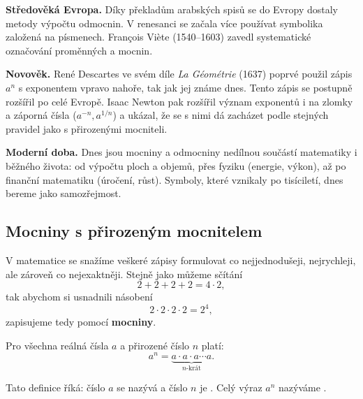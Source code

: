 \documentclass[12pt,a4paper]{article}
\begin{document}
\begin{historicalbox}
\smallskip
\textbf{Středověká Evropa.}  
Díky překladům arabských spisů se do Evropy dostaly metody výpočtu odmocnin. V renesanci se začala více používat symbolika založená na písmenech. François Viète (1540–1603) zavedl systematické označování proměnných a mocnin.  

\smallskip
\textbf{Novověk.}  
René Descartes ve svém díle \emph{La Géométrie} (1637) poprvé použil zápis \(a^n\) s exponentem vpravo nahoře, tak jak jej známe dnes. Tento zápis se postupně rozšířil po celé Evropě.  
Isaac Newton pak rozšířil význam exponentů i na zlomky a záporná čísla (\(a^{-n}, a^{1/n}\)) a ukázal, že se s nimi dá zacházet podle stejných pravidel jako s přirozenými mocniteli.

\smallskip
\textbf{Moderní doba.}  
Dnes jsou mocniny a odmocniny nedílnou součástí matematiky i běžného života: od výpočtu ploch a objemů, přes fyziku (energie, výkon), až po finanční matematiku (úročení, růst). Symboly, které vznikaly po tisíciletí, dnes bereme jako samozřejmost.
\end{historicalbox}


\subsection{Mocniny s přirozeným mocnitelem}

V matematice se snažíme veškeré zápisy formulovat co nejjednodušeji, nejrychleji,
ale zároveň co nejexaktněji. Stejně jako můžeme sčítání
\[
2 + 2 + 2 + 2 = 4 \cdot 2,
\]
tak abychom si usnadnili násobení
\[
2 \cdot 2 \cdot 2 \cdot 2 = 2^4,
\]
zapisujeme tedy pomocí \textbf{mocniny}.

\begin{definitionbox}
Pro všechna reálná čísla \(a\) a přirozené číslo \(n\) platí:
\[
a^n = \underbrace{a \cdot a \cdot a \cdots a}_{n\text{-krát}}.
\]
\end{definitionbox}

Tato definice říká: číslo \(a\) se nazývá  a 
číslo \(n\) je .  
Celý výraz \(a^n\) nazýváme .

\begin{center}
\end{center}
\end{document}

